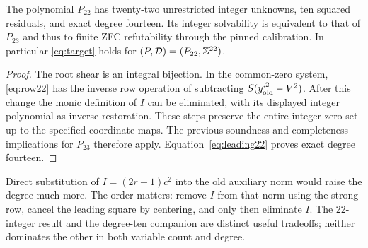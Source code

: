 \begin{theorem}
The polynomial $P_{22}$ has twenty-two unrestricted integer unknowns,
ten squared residuals, and exact degree fourteen. Its integer solvability
is equivalent to that of $P_{23}$ and thus to finite ZFC refutability
through the pinned calibration. In particular \eqref{eq:target} holds
for $(P,\mathcal D)=(P_{22},\mathbb Z^{22})$.
\end{theorem}
\begin{proof}
The root shear is an integral bijection. In the common-zero system,
\eqref{eq:row22} has the inverse row operation of subtracting
$S(y_{\rm old}^{,2}-V^2)$. After this change the monic definition of
$I$ can be eliminated, with its displayed integer polynomial as inverse
restoration. These steps preserve the entire integer zero set up to the
specified coordinate maps. The previous soundness and completeness
implications for $P_{23}$ therefore apply. Equation~\eqref{eq:leading22}
proves exact degree fourteen.
\end{proof}

Direct substitution of $I=(2r+1)c^2$ into the old auxiliary norm would
raise the degree much more. The order matters: remove $I$ from that norm
using the strong row, cancel the leading square by centering, and only
then eliminate $I$. The 22-integer result and the degree-ten companion
are distinct useful tradeoffs; neither dominates the other in both
variable count and degree.
